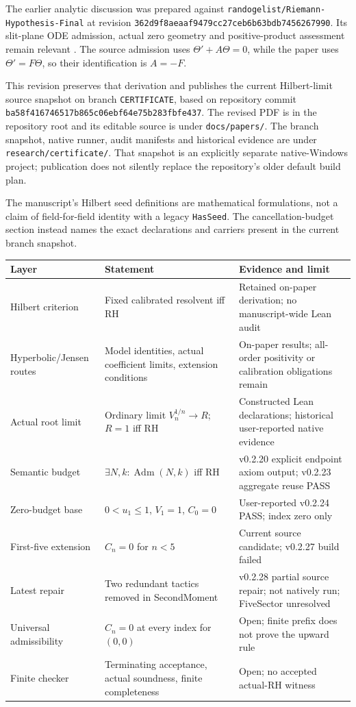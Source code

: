 \documentclass[11pt,a4paper]{article}
\numberwithin{equation}{section}
\theoremstyle{definition}
\theoremstyle{remark}
\newcommand{\reposha}{\texttt{362d9f8aeaaf9479cc27ceb6b63bdb7456267990}}
\begin{document}
The earlier analytic discussion was prepared against
\texttt{randogelist/Riemann-Hypothesis-Final} at revision \reposha.
Its slit-plane ODE admission, actual zero geometry and positive-product
assessment remain relevant \cite{repo-ode,repo-geometry,repo-product}.
The source admission uses $\Theta'+A\Theta=0$, while the paper uses
$\Theta'=F\Theta$, so their identification is $A=-F$.

This revision preserves that derivation and publishes the current Hilbert-limit
source snapshot on branch \texttt{CERTIFICATE}, based on repository commit
\nolinkurl{ba58f416746517b865c06ebf64e75b283fbfe437}.
The revised PDF is in the repository root and its editable source is under
\nolinkurl{docs/papers/}. The branch snapshot, native runner, audit manifests
and historical evidence are under \nolinkurl{research/certificate/}.
That snapshot is an explicitly separate native-Windows project; publication
does not silently replace the repository's older default build plan.

The manuscript's Hilbert seed definitions are mathematical formulations,
not a claim of field-for-field identity with a legacy \texttt{HasSeed}.
The cancellation-budget section instead names the exact declarations and
carriers present in the current branch snapshot.

\begin{longtable}{@{}>{\raggedright\arraybackslash}p{}>{\raggedright\arraybackslash}p{}>{\raggedright\arraybackslash}p{}@{}}
\toprule
\textbf{Layer}&\textbf{Statement}&\textbf{Evidence and limit}\\
\midrule\endhead
Hilbert criterion&Fixed calibrated resolvent iff RH&Retained on-paper derivation; no manuscript-wide Lean audit\\
\addlinespace
Hyperbolic/Jensen routes&Model identities, actual coefficient limits, extension conditions&On-paper results; all-order positivity or calibration obligations remain\\
\addlinespace
Actual root limit&Ordinary limit $V_n^{1/n}\to R$; $R=1$ iff RH&Constructed Lean declarations; historical user-reported native evidence\\
\addlinespace
Semantic budget&$\exists N,k:\operatorname{Adm}(N,k)$ iff RH&v0.2.20 explicit endpoint axiom output; v0.2.23 aggregate reuse PASS\\
\addlinespace
Zero-budget base&$0<u_1\le1$, $V_1=1$, $C_0=0$&User-reported v0.2.24 PASS; index zero only\\
\addlinespace
First-five extension&$C_n=0$ for $n<5$&Current source candidate; v0.2.27 build failed\\
\addlinespace
Latest repair&Two redundant tactics removed in SecondMoment&v0.2.28 partial source repair; not natively run; FiveSector unresolved\\
\addlinespace
Universal admissibility&$C_n=0$ at every index for $(0,0)$&Open; finite prefix does not prove the upward rule\\
\addlinespace
Finite checker&Terminating acceptance, actual soundness, finite completeness&Open; no accepted actual-RH witness\\
\bottomrule
\end{longtable}
\end{document}
